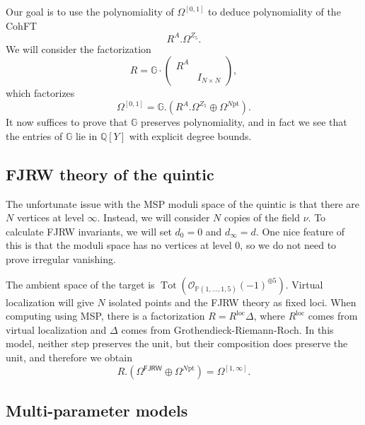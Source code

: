 \documentclass[10pt,oldfontcommands,oneside]{memoir}
\theoremstyle{definition}
\theoremstyle{remark}
\theoremstyle{plain}
\theoremstyle{definition}
\theoremstyle{remark}
\newcommand{\G}{\mathbb{G}}
\newcommand{\Q}{\mathbb{Q}}
\renewcommand{\P}{\mathbb{P}}
\newcommand{\mc}[1]{\mathcal{#1}}
\newcommand{\mr}[1]{\mathrm{#1}}
\newcommand{\on}[1]{\operatorname{#1}}
\newcommand{\ms}[1]{\mathsf{#1}}
\newcommand{\1}{\mathbf{1}}
\newcommand{\2}{\mathbf{2}}
\newcommand{\3}{\mathbf{3}}
\newcommand{\pt}{\mr{pt}}
\newcommand{\FJRW}{\ms{FJRW}}
\begin{document}
Our goal is to use the polynomiality of $\Omega^{[0,1]}$ to deduce polynomiality of the CohFT
\[ R^A . \Omega^{Z_5}. \]
We will consider the factorization
\[ R = \G \cdot \begin{pmatrix}
    R^A & \\
    & I_{N \times N}
\end{pmatrix}, \]
which factorizes
\[ \Omega^{[0,1]} = \G . (R^A . \Omega^{Z_5} \oplus \Omega^{N\pt}). \]
It now suffices to prove that $\G$ preserves polynomiality, and in fact we see that the entries of $\G$ lie in $\Q[Y]$ with explicit degree bounds.

\subsection{FJRW theory of the quintic}%
\label{sub:FJRW theory of the quintic}

The unfortunate issue with the MSP moduli space of the quintic is that there are $N$ vertices at level $\infty$. Instead, we will consider $N$ copies of the field $\nu$. To calculate FJRW invariants, we will set $d_0 = 0$ and $d_{\infty} = d$. One nice feature of this is that the moduli space has no vertices at level $0$, so we do not need to prove irregular vanishing.

The ambient space of the target is
$\on{Tot}(\mc{O}_{\P(1,\ldots, 1,5)}(-1)^{\oplus 5})$. 
Virtual localization will give $N$ isolated points and the FJRW theory as fixed loci. When computing using MSP, there is a factorization $R = R^{\on{loc}} \Delta$, where $R^{\on{loc}}$ comes from virtual localization and $\Delta$ comes from Grothendieck-Riemann-Roch. In this model, neither step preserves the unit, but their composition does preserve the unit, and therefore we obtain
\[ R.(\Omega^{\FJRW} \oplus \Omega^{N\pt}) = \Omega^{[1,\infty]}. \]

\subsection{Multi-parameter models}%
\label{sub:Multi-parameter models}
\end{document}
